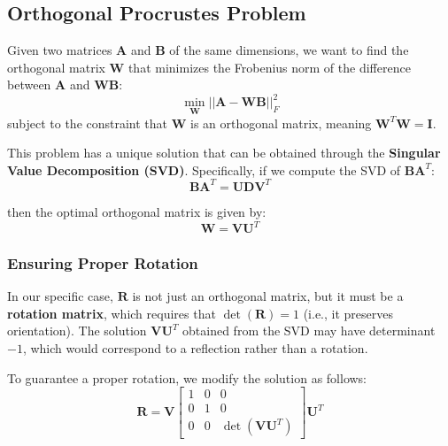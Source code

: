 \documentclass[11pt,a4paper]{article}
\theoremstyle{definition}
\theoremstyle{plain}
\theoremstyle{remark}
\begin{document}
\subsection{Orthogonal Procrustes Problem}\label{subsec:orthogonal_procrustes}

\begin{tcolorbox}[colback=purple!5!white,colframe=purple!75!black,title=\textbf{Orthogonal Procrustes Problem}]
Given two matrices $\mathbf{A}$ and $\mathbf{B}$ of the same dimensions, we want to find the orthogonal matrix $\mathbf{W}$ that minimizes the Frobenius norm of the difference between $\mathbf{A}$ and $\mathbf{W} \mathbf{B}$:
\begin{equation} \nonumber
    \min_{\mathbf{W}} ||\mathbf{A} - \mathbf{W} \mathbf{B}||_F^2
\end{equation}
subject to the constraint that $\mathbf{W}$ is an orthogonal matrix, meaning $\mathbf{W}^T \mathbf{W} = \mathbf{I}$.
\end{tcolorbox}

This problem has a unique solution that can be obtained through the \textbf{Singular Value Decomposition (SVD)}. Specifically, if we compute the SVD of $\mathbf{B} \mathbf{A}^T$:
\begin{equation} \nonumber
    \mathbf{B} \mathbf{A}^T = \mathbf{U} \mathbf{D} \mathbf{V}^T
\end{equation}

then the optimal orthogonal matrix is given by:
\begin{equation} \nonumber
    \mathbf{W} = \mathbf{V} \mathbf{U}^T
\end{equation}

\subsubsection{Ensuring Proper Rotation}\label{subsubsec:ensuring_rotation}

In our specific case, $\mathbf{R}$ is not just an orthogonal matrix, but it must be a \textbf{rotation matrix}, which requires that $\det(\mathbf{R}) = 1$ (i.e., it preserves orientation). The solution $\mathbf{V} \mathbf{U}^T$ obtained from the SVD may have determinant $-1$, which would correspond to a reflection rather than a rotation.

To guarantee a proper rotation, we modify the solution as follows:
\begin{equation} \nonumber
    \mathbf{R} = \mathbf{V} \begin{bmatrix} 1 & 0 & 0 \\ 0 & 1 & 0 \\ 0 & 0 & \det(\mathbf{V} \mathbf{U}^T) \end{bmatrix} \mathbf{U}^T
\end{equation}
\end{document}
